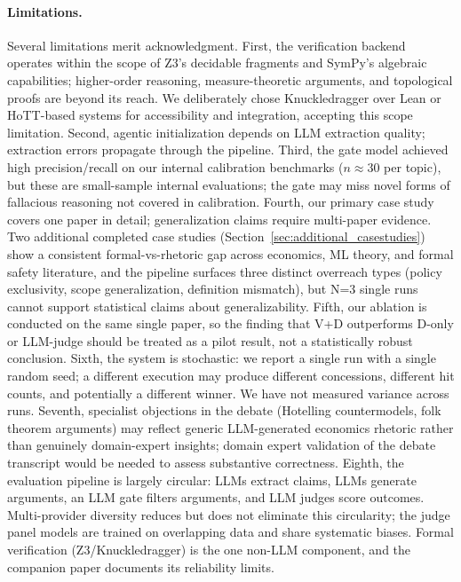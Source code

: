 \documentclass[11pt]{article}
\begin{document}
\paragraph{Limitations.}
Several limitations merit acknowledgment.
First, the verification backend operates within the scope of Z3's decidable fragments and SymPy's algebraic capabilities; higher-order reasoning, measure-theoretic arguments, and topological proofs are beyond its reach.
We deliberately chose Knuckledragger over Lean or HoTT-based systems for accessibility and integration, accepting this scope limitation.
Second, agentic initialization depends on LLM extraction quality; extraction errors propagate through the pipeline.
Third, the gate model achieved high precision/recall on our internal calibration benchmarks ($n \approx 30$ per topic), but these are small-sample internal evaluations; the gate may miss novel forms of fallacious reasoning not covered in calibration.
Fourth, our primary case study covers one paper in detail; generalization claims require multi-paper evidence. Two additional completed case studies (Section~\ref{sec:additional_casestudies}) show a consistent formal-vs-rhetoric gap across economics, ML theory, and formal safety literature, and the pipeline surfaces three distinct overreach types (policy exclusivity, scope generalization, definition mismatch), but N=3 single runs cannot support statistical claims about generalizability. Fifth, our ablation is conducted on the same single paper, so the finding that V+D outperforms D-only or LLM-judge should be treated as a pilot result, not a statistically robust conclusion. Sixth, the system is stochastic: we report a single run with a single random seed; a different execution may produce different concessions, different hit counts, and potentially a different winner. We have not measured variance across runs. Seventh, specialist objections in the debate (Hotelling countermodels, folk theorem arguments) may reflect generic LLM-generated economics rhetoric rather than genuinely domain-expert insights; domain expert validation of the debate transcript would be needed to assess substantive correctness. Eighth, the evaluation pipeline is largely circular: LLMs extract claims, LLMs generate arguments, an LLM gate filters arguments, and LLM judges score outcomes. Multi-provider diversity reduces but does not eliminate this circularity; the judge panel models are trained on overlapping data and share systematic biases. Formal verification (Z3/Knuckledragger) is the one non-LLM component, and the companion paper documents its reliability limits.
\end{document}
